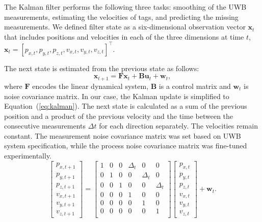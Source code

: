 The Kalman filter performs the following three tasks: smoothing of the UWB measurements, estimating the velocities of tags, and predicting the missing measurements. We defined filter state as a six-dimensional observation vector $\mathbf{x}_t$ that includes positions and velocities in each of the three dimensions at time $t$, $\mathbf{x}_t=[p_{x, t}, p_{y, t}, p_{z, t}, v_{x, t}, v_{y, t}, v_{z, t}]^\intercal$.

The next state is estimated from the previous state as follows:
\begin{equation}
\label{eq:kalmanUpdate}
\mathbf{x}_{t+1} = \mathbf{F} \mathbf{x}_t + \mathbf{B} \mathbf{u}_t + \mathbf{w}_t,
\end{equation}
where $\mathbf{F}$ encodes the linear dynamical system, $\mathbf{B}$ is a control matrix and $\mathbf{w}_t$ is noise covariance matrix. In our case, the Kalman update is  simplified to Equation~(\ref{eq:kalman}). The next state is calculated as a sum of the previous position and a product of the previous velocity and the time between the consecutive measurements $\Delta t$ for each direction separately. The velocities remain constant. The measurement noise covariance matrix was set based on UWB system specification, while the process noise covariance matrix was fine-tuned experimentally. 
\begin{equation}
\label{eq:kalman}
\begin{bmatrix}
p_{x, t+1} \\
p_{y, t+1} \\
p_{z, t+1} \\
v_{x, t+1} \\
v_{y, t+1} \\
v_{z, t+1}
\end{bmatrix} 
=
\begin{bmatrix}
1 & 0 & 0 & \Delta_t & 0 & 0 \\
0 & 1 & 0 & 0 & \Delta_t & 0 \\
0 & 0 & 1 & 0 & 0 & \Delta_t \\
0 & 0 & 0 & 1 & 0 & 0 \\
0 & 0 & 0 & 0 & 1 & 0 \\
0 & 0 & 0 & 0 & 0 & 1 \\
\end{bmatrix} 
\begin{bmatrix}
p_{x, t} \\
p_{y, t} \\
p_{z, t} \\
v_{x, t} \\
v_{y, t} \\
v_{z, t}
\end{bmatrix}
+ \mathbf{w}_t.
\end{equation}

